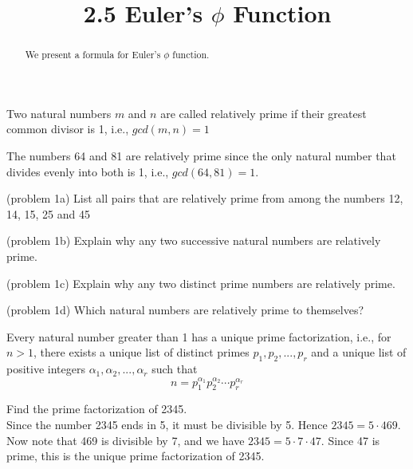 \documentclass[handout]{ximera}
\title{2.5 Euler's $\phi$ Function}
\begin{document}
\begin{abstract}
We present a formula for Euler's $\phi$ function.
\end{abstract}

\maketitle


\begin{definition}
Two natural numbers $m$ and $n$ are called relatively prime if their greatest common divisor is 1, i.e., $gcd(m,n) = 1$
\end{definition}

\begin{example}[example 1]
The numbers 64 and 81 are relatively prime since the only natural number that divides evenly into both is 1, i.e., $gcd(64,81) = 1$.
\end{example}

\begin{problem}(problem 1a)
List all pairs that are relatively prime from among the numbers 12, 14, 15, 25 and 45
\end{problem}

\begin{problem}(problem 1b)
Explain why any two successive natural numbers are relatively prime.
\end{problem}

\begin{problem}(problem 1c)
Explain why any two distinct prime numbers are relatively prime.
\end{problem}

\begin{problem}(problem 1d)
Which natural numbers are relatively prime to themselves?
\end{problem}

\begin{theorem}
Every natural number greater than 1 has a unique prime factorization, i.e., for $n >1$, there exists a 
unique list of distinct primes
$p_1, p_2, ..., p_r$ and a unique list of positive integers $\alpha_1, \alpha_2, ..., \alpha_r$ such that
\[
n = p_1^{\alpha_1}p_2^{\alpha_2}\cdots p_r^{\alpha_r}
\]
\end{theorem}


\begin{example}[example 2]
Find the prime factorization of 2345.\\
Since the number 2345 ends in 5, it must be divisible by 5.  Hence $2345 = 5 \cdot 469$. Now note that 469 is divisible by 7,
and we have $2345 = 5 \cdot 7 \cdot 47$. Since 47 is prime, this is the unique prime factorization of 2345.
\end{example}
\end{document}
